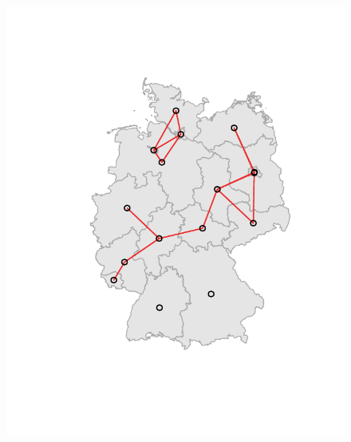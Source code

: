 \begin{figure} %
    \centering %
    \begin{minipage}[b]{.3\linewidth} %
        \includegraphics[width=\linewidth,trim={2cm 3cm 1.7cm 2cm},clip]{body/figures/51-BL_nb_d-26k.pdf} %
    \end{minipage} %
    \hfill

\end{figure}
